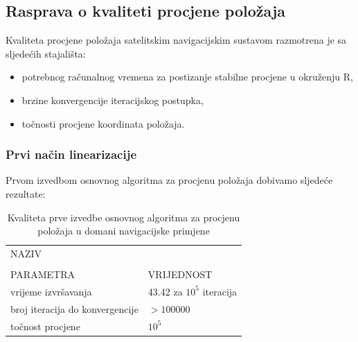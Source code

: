 \documentclass[a4paper,twoside,12pt]{memoir} %
\begin{document}
\subsection{Rasprava o kvaliteti procjene položaja}
Kvaliteta procjene položaja satelitskim navigacijskim sustavom razmotrena je sa sljedećih stajališta:
\begin{itemize}
	\item potrebnog računalnog vremena za postizanje stabilne procjene u okruženju R,
	\item brzine konvergencije iteracijskog postupka,
	\item točnosti procjene koordinata položaja.
\end{itemize}

\subsubsection{Prvi način linearizacije}
Prvom izvedbom osnovnog algoritma za procjenu položaja dobivamo sljedeće rezultate:
\begin{table}[H]
	\caption{Kvaliteta prve izvedbe osnovnog algoritma za procjenu položaja u domani navigacijske primjene}
	\begin{center}
		\begin{tabular}{|p{3cm}|p{4cm}}
			\hline
			\rowcolor{lightgray}NAZIV&   \\
			\rowcolor{lightgray}&   \\
			\multirow{-3}{1cm}{ \cellcolor{lightgray}PARAMETRA} & \multirow{-3}{2cm}{\cellcolor{lightgray}VRIJEDNOST} \\
			\hline
			\vspace{0.1cm}
			vrijeme izvršavanja & \vspace{0.1cm}  43.42 za $10^5$ iteracija\\
			\vspace{0.1cm}
			broj iteracija do konvergencije & \vspace{0.1cm} $> 100000$ \\
			\vspace{0.1cm}
			točnost procjene & \vspace{0.1cm} $10^5$ \\
			\hline
		\end{tabular}
	\end{center}
\end{table}
\end{document}
